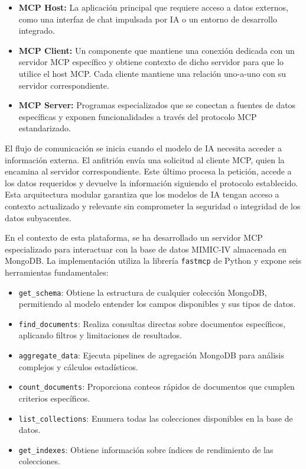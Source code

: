 \begin{itemize}
\item \textbf{MCP Host:} La aplicación principal que requiere acceso a datos externos, como una interfaz de chat impulsada por IA o un entorno de desarrollo integrado.
\item \textbf{MCP Client:} Un componente que mantiene una conexión dedicada con un servidor MCP específico y obtiene contexto de dicho servidor para que lo utilice el host MCP. Cada cliente mantiene una relación uno-a-uno con su servidor correspondiente.
\item \textbf{MCP Server:} Programas especializados que se conectan a fuentes de datos específicas y exponen funcionalidades a través del protocolo MCP estandarizado.
\end{itemize}

El flujo de comunicación se inicia cuando el modelo de IA necesita acceder a información externa. El anfitrión envía una solicitud al cliente MCP, quien la encamina al servidor correspondiente. Este último procesa la petición, accede a los datos requeridos y devuelve la información siguiendo el protocolo establecido. Esta arquitectura modular garantiza que los modelos de IA tengan acceso a contexto actualizado y relevante sin comprometer la seguridad o integridad de los datos subyacentes.

En el contexto de esta plataforma, se ha desarrollado un servidor MCP especializado para interactuar con la base de datos MIMIC-IV almacenada en MongoDB. La implementación utiliza la librería \texttt{fastmcp} de Python y expone seis herramientas fundamentales:

\begin{itemize}
\item \texttt{get\_schema}: Obtiene la estructura de cualquier colección MongoDB, permitiendo al modelo entender los campos disponibles y sus tipos de datos.
\item \texttt{find\_documents}: Realiza consultas directas sobre documentos específicos, aplicando filtros y limitaciones de resultados.
\item \texttt{aggregate\_data}: Ejecuta pipelines de agregación MongoDB para análisis complejos y cálculos estadísticos.
\item \texttt{count\_documents}: Proporciona conteos rápidos de documentos que cumplen criterios específicos.
\item \texttt{list\_collections}: Enumera todas las colecciones disponibles en la base de datos.
\item \texttt{get\_indexes}: Obtiene información sobre índices de rendimiento de las colecciones.
\end{itemize}

